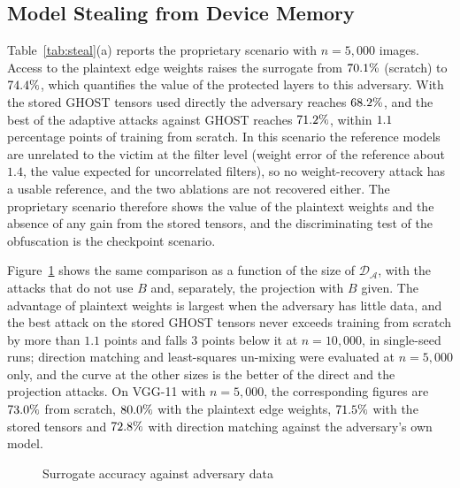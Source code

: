 \documentclass[lettersize,journal]{IEEEtran}
\begin{document}
\subsection{Model Stealing from Device Memory}
Table~\ref{tab:steal}(a) reports the proprietary scenario with $n=5{,}000$ images. Access to the plaintext edge weights raises the surrogate from $70.1\%$ (scratch) to $74.4\%$, which quantifies the value of the protected layers to this adversary. With the stored GHOST tensors used directly the adversary reaches $68.2\%$, and the best of the adaptive attacks against GHOST reaches $71.2\%$, within $1.1$ percentage points of training from scratch. In this scenario the reference models are unrelated to the victim at the filter level (weight error of the reference about $1.4$, the value expected for uncorrelated filters), so no weight-recovery attack has a usable reference, and the two ablations are not recovered either. The proprietary scenario therefore shows the value of the plaintext weights and the absence of any gain from the stored tensors, and the discriminating test of the obfuscation is the checkpoint scenario.


Figure~\ref{fig:stealn} shows the same comparison as a function of the size of $\mathcal{D}_{\mathcal{A}}$, with the attacks that do not use $B$ and, separately, the projection with $B$ given. The advantage of plaintext weights is largest when the adversary has little data, and the best attack on the stored GHOST tensors never exceeds training from scratch by more than $1.1$ points and falls $3$ points below it at $n=10{,}000$, in single-seed runs; direction matching and least-squares un-mixing were evaluated at $n=5{,}000$ only, and the curve at the other sizes is the better of the direct and the projection attacks. On VGG-11 with $n=5{,}000$, the corresponding figures are $73.0\%$ from scratch, $80.0\%$ with the plaintext edge weights, $71.5\%$ with the stored tensors and $72.8\%$ with direction matching against the adversary's own model.

\begin{figure}[!t]
\centering

\caption{Surrogate accuracy against adversary data}
\label{fig:stealn}
\end{figure}
\end{document}
